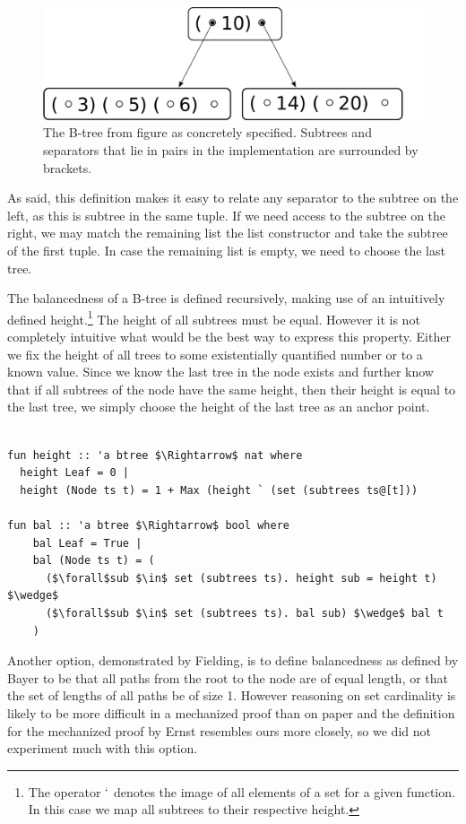 \begin{figure}
    \centering
    \includegraphics[width=0.5\linewidth]{figures/btree-basic.pdf}
    \caption[Visualization of the implementation choice for B-Trees]
    {The B-tree from figure  as concretely specified.
    Subtrees and separators that lie in pairs in the implementation are surrounded by brackets.}
    \label{fig:btree-basic}
\end{figure}


As said, this definition makes it easy to relate any separator
to the subtree on the left, as this is subtree in the same tuple.
If we need access to the subtree on the right,
we may match the remaining list the list constructor
and take the subtree of the first tuple.
In case the remaining list is empty,
we need to choose the last tree.

The balancedness of a B-tree is defined recursively, making use
of an intuitively defined height.\footnote{
    The operator $`$ denotes the image of all elements of a set for a given function.
    In this case we map all subtrees to their respective height.
}
The height of all subtrees must be equal.
However it is not completely intuitive
what would be the best way to express this property.
Either we fix the height of all trees
to some existentially quantified number or to a known value.
Since we know the last tree in the node exists and further
know that if all subtrees of the node have the same height,
then their height is equal to the last tree,
we simply choose the height of the last tree as an anchor point.


\begin{lstlisting}[mathescape=true, language=Isabelle]

fun height :: 'a btree $\Rightarrow$ nat where
  height Leaf = 0 |
  height (Node ts t) = 1 + Max (height ` (set (subtrees ts@[t]))

fun bal :: 'a btree $\Rightarrow$ bool where
    bal Leaf = True |
    bal (Node ts t) = (
      ($\forall$sub $\in$ set (subtrees ts). height sub = height t) $\wedge$
      ($\forall$sub $\in$ set (subtrees ts). bal sub) $\wedge$ bal t
    )
\end{lstlisting}

Another option, demonstrated by Fielding, is
to define balancedness as defined by Bayer
to be that all paths from the root to the node are of equal length,
or that the set of lengths of all paths be of size 1.
However reasoning on set cardinality is likely to be more difficult
in a mechanized proof than on paper
and the definition for the mechanized proof by Ernst resembles
ours more closely, so we did not experiment much with this option.

